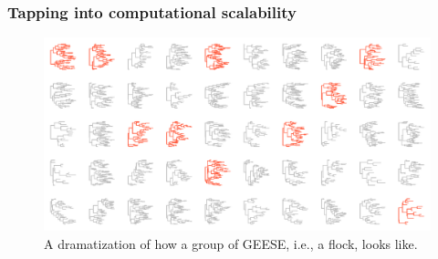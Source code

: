 \documentclass[aspectratio=169,9pt,handout]{beamer}
\begin{document}
%	
%	
%	
%	

\begin{frame}
	\frametitle{Tapping into computational scalability}
	\pause
	\begin{figure}
		\includegraphics[width=.8\linewidth]{flock-plot.pdf}
		\caption{A dramatization of how a group of GEESE, i.e., a flock, looks like.}
	\end{figure}
	
\end{frame}
\end{document}
